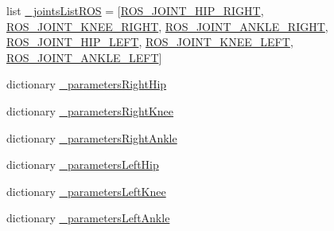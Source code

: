 \begin{DoxyCompactItemize}
\item 
list \mbox{\hyperlink{namespacepedal__simulation__interpolation__linear__trajectory__points_ac3814b85b594eab0e70346d90890e265}{\+\_\+joints\+List\+R\+OS}} = \mbox{[}\mbox{\hyperlink{namespacepedal__simulation__interpolation__linear__trajectory__points_a073eb93be3570097fd140f4488393467}{R\+O\+S\+\_\+\+J\+O\+I\+N\+T\+\_\+\+H\+I\+P\+\_\+\+R\+I\+G\+HT}}, \mbox{\hyperlink{namespacepedal__simulation__interpolation__linear__trajectory__points_af1c84f3b73df0161dd11c10d2faa4112}{R\+O\+S\+\_\+\+J\+O\+I\+N\+T\+\_\+\+K\+N\+E\+E\+\_\+\+R\+I\+G\+HT}}, \mbox{\hyperlink{namespacepedal__simulation__interpolation__linear__trajectory__points_a593c7b6f49b5c4ba041aa3efe609fb75}{R\+O\+S\+\_\+\+J\+O\+I\+N\+T\+\_\+\+A\+N\+K\+L\+E\+\_\+\+R\+I\+G\+HT}}, \mbox{\hyperlink{namespacepedal__simulation__interpolation__linear__trajectory__points_a4134acdea8d46c49c3031087a5dfa459}{R\+O\+S\+\_\+\+J\+O\+I\+N\+T\+\_\+\+H\+I\+P\+\_\+\+L\+E\+FT}}, \mbox{\hyperlink{namespacepedal__simulation__interpolation__linear__trajectory__points_a0e2787b945854e034b47dec8918298f2}{R\+O\+S\+\_\+\+J\+O\+I\+N\+T\+\_\+\+K\+N\+E\+E\+\_\+\+L\+E\+FT}}, \mbox{\hyperlink{namespacepedal__simulation__interpolation__linear__trajectory__points_a601687afe04f4c7814fee7ac4af804f6}{R\+O\+S\+\_\+\+J\+O\+I\+N\+T\+\_\+\+A\+N\+K\+L\+E\+\_\+\+L\+E\+FT}}\mbox{]}
\item 
dictionary \mbox{\hyperlink{namespacepedal__simulation__interpolation__linear__trajectory__points_a53987684da94775e9edf9a7f856f7d23}{\+\_\+parameters\+Right\+Hip}}
\item 
dictionary \mbox{\hyperlink{namespacepedal__simulation__interpolation__linear__trajectory__points_adc766045ef9ecc1e718307b55df361f5}{\+\_\+parameters\+Right\+Knee}}
\item 
dictionary \mbox{\hyperlink{namespacepedal__simulation__interpolation__linear__trajectory__points_a442747fc78d2d06fd3f9def983a6fe62}{\+\_\+parameters\+Right\+Ankle}}
\item 
dictionary \mbox{\hyperlink{namespacepedal__simulation__interpolation__linear__trajectory__points_a10d3f51a296f22b0418e917a305caa33}{\+\_\+parameters\+Left\+Hip}}
\item 
dictionary \mbox{\hyperlink{namespacepedal__simulation__interpolation__linear__trajectory__points_a29ff49c9473fb6cd2353aa2ecb74d3f1}{\+\_\+parameters\+Left\+Knee}}
\item 
dictionary \mbox{\hyperlink{namespacepedal__simulation__interpolation__linear__trajectory__points_a7373ef0f60bd03a128d685c0e4f825b7}{\+\_\+parameters\+Left\+Ankle}}

\end{DoxyCompactItemize}
